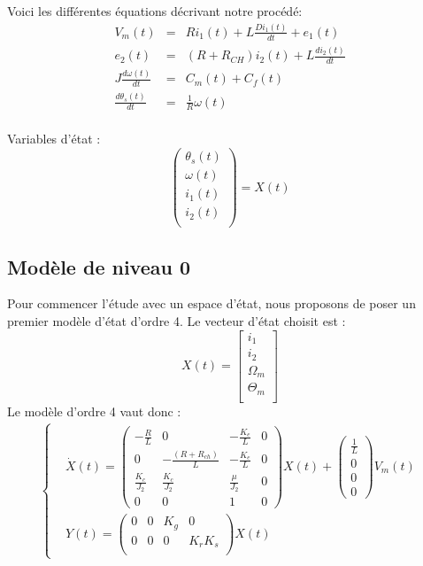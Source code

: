 \hspace{5mm} \textbullet \hspace{5mm} Voici les différentes équations décrivant notre procédé:
\begin{eqnarray}
V_m(t)  					&=& 	R i_1(t) + L \frac{D i_1(t)}{d t} + e_1(t) \\
e_2(t) 						&=& 	(R+R_{CH}) i_2(t) + L \frac{d i_2(t)}{d t} \\
J \frac{d \omega(t)}{dt} 	&=&		C_m(t) + C_f(t)		\\
 \frac{d \theta_s(t)}{dt} 	&=&		\frac{1}{R}\omega(t) \\
\end{eqnarray}

\hspace{5mm} \textbullet \hspace{5mm} Variables d'état :
\begin{equation}
\begin{pmatrix}
\theta_s(t)\\
\omega(t)\\
i_1(t)\\
i_2(t)\\
\end{pmatrix}
=
X(t)
\end{equation}
\subsection{Modèle de niveau 0}
Pour commencer l'étude avec un espace d'état, nous proposons de poser un premier modèle d'état d'ordre 4. Le vecteur d'état choisit est :
\begin{equation}
X(t)=\begin{bmatrix}
i_1\\
i_2\\
\Omega_m\\
\Theta_m\\
\end{bmatrix}
\end{equation} 
Le modèle d'ordre 4 vaut donc :
\begin{align}
\label{EE0}
\left\lbrace
\begin{aligned}
&\dot{X}(t) = \begin{pmatrix}
-\frac{R}{L}	& 	    0				&   -\frac{K_e}{L}	& 0\\
      0			&  -\frac{(R+R_{ch})}{L}	&	-\frac{K_e}{L}	& 0\\
\frac{K_c}{J_2}	&	\frac{K_c}{J_2}		&	\frac{\mu}{J_2}	&	0\\
0&	0&	1&	0
\end{pmatrix}X(t)+\begin{pmatrix}
\frac{1}{L}\\0\\0\\0
\end{pmatrix}V_m(t)\\
&Y(t) = \begin{pmatrix}
0&	0&	K_g	&	0\\
0&	0&	0	&	K_rK_s\\
\end{pmatrix}X(t)
\end{aligned}
\right.
\end{align}
